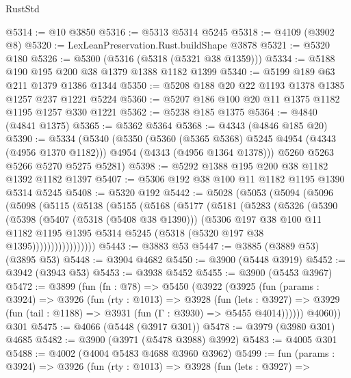 \begin{lexlean}{RustStd}
\begin{coremodule}
@5314 := @10 @3850
@5316 := @5313 @5314 @5245
@5318 := @4109 (@3902 @8)
@5320 := LexLeanPreservation.Rust.buildShape @3878
@5321 := @5320 @180
@5326 := @5300 (@5316 (@5318 (@5321 @38 @1359)))
@5334 := @5188 @190 @195 @200 @38 @1379 @1388 @1182 @1399
@5340 := @5199 @189 @63 @211 @1379 @1386 @1344
@5350 := @5208 @188 @20 @22 @1193 @1378 @1385 @1257 @237 @1221 @5224
@5360 := @5207 @186 @100 @20 @11 @1375 @1182 @1195 @1257 @330 @1221
@5362 := @5238 @185 @1375
@5364 := @4840 (@4841 @1375)
@5365 := @5362 @5364
@5368 := @4343 (@4846 @185 @20)
@5390 := @5334
    (@5340
      (@5350
        (@5360 (@5365 @5368) @5245 @4954 (@4343 (@4956 @1370 @1182)))
        @4954
        (@4343 (@4956 @1364 @1378)))
      @5260
      @5263
      @5266
      @5270
      @5275
      @5281)
@5398 := @5292 @1388 @195 @200 @38 @1182 @1392 @1182 @1397
@5407 := @5306 @192 @38 @100 @11 @1182 @1195 @1390 @5314 @5245
@5408 := @5320 @192
@5442 := @5028
    (@5053
      (@5094
        (@5096
          (@5098
            (@5115
              (@5138
                (@5155
                  (@5168
                    (@5177
                      (@5181
                        (@5283
                          (@5326
                            (@5390
                              (@5398
                                (@5407 (@5318 (@5408 @38 @1390)))
                                (@5306
                                  @197
                                  @38
                                  @100
                                  @11
                                  @1182
                                  @1195
                                  @1395
                                  @5314
                                  @5245
                                  (@5318 (@5320 @197 @38 @1395)))))))))))))))))
@5443 := @3883 @53
@5447 := @3885 (@3889 @53) (@3895 @53)
@5448 := @3904 @4682
@5450 := @3900 (@5448 @3919)
@5452 := @3942 (@3943 @53)
@5453 := @3938 @5452
@5455 := @3900 (@5453 @3967)
@5472 := @3899
    (fun (fn : @78) =>
    @5450
      (@3922
        (@3925
          (fun (params : @3924) =>
          @3926
            (fun (rty : @1013) =>
            @3928
              (fun (lets : @3927) =>
              @3929 (fun (tail : @1188) => @3931 (fun (Γ : @3930) => @5455 @4014))))))
        @4060))
    @301
@5475 := @4066 (@5448 (@3917 @301))
@5478 := @3979 (@3980 @301) @4685
@5482 := @3900 (@3971 (@5478 @3988) @3992)
@5483 := @4005 @301
@5488 := @4002 (@4004 @5483 @4688 @3960 @3962)
@5499 := fun (params : @3924) =>
  @3926
    (fun (rty : @1013) =>
    @3928
      (fun (lets : @3927) =>

\end{coremodule}
\end{lexlean}
